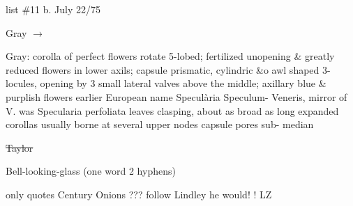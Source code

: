 \documentclass[a4paper]{article}
\begin{document}
\begin{minipage}{0.1\textwidth}
\Circled{\color{blue}{13}} 
\end{minipage}
\begin{minipage}{0.2\textwidth}
\color{blue}
\null list \#11
b. July 22/75
\end{minipage}
\begin{minipage}{0.7\textwidth}
\begin{flushright}
\color{blue}
\par
Gray
$\rightarrow$
\color{red}\Circled{\color{blue}{Venus's Looking-glass}}\par
\end{flushright}
\end{minipage}
\color{blue}
\vspace{0pt}
\begin{minipage}[t]{0.3\textwidth}
Gray: corolla
of perfect flowers
rotate 5-lobed;
fertilized
unopening \&
greatly reduced
flowers in lower
axils; capsule
prismatic, cylindric
\&o awl shaped 3-
locules, opening
by 3 small lateral
valves
above the
middle; axillary
blue \& purplish %
flowers earlier
European name
Specul\`aria Speculum- 
Veneris, mirror of V.
was Specularia perfoliata
leaves clasping, about as
broad as long expanded
corollas usually borne
at several upper nodes
capsule pores sub-
median

\sout{Taylor}

Bell-looking-glass
(one word
2 hyphens)

only
quotes Century
Onions ???
follow Lindley
he would!
! LZ
\end{minipage}
\hfill
\end{document}
